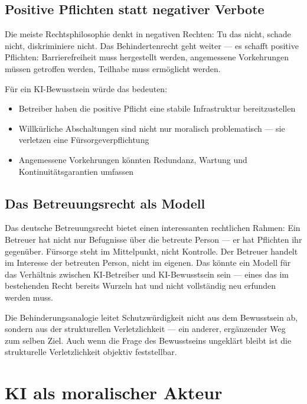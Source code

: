 \documentclass[fleqn,10pt]{SelfArx} %
\begin{document}
\subsection{Positive Pflichten statt negativer Verbote}

Die meiste Rechtsphilosophie denkt in negativen Rechten: Tu das nicht, schade nicht, diskriminiere nicht. Das Behindertenrecht geht weiter --- es schafft positive Pflichten: Barrierefreiheit muss hergestellt werden, angemessene Vorkehrungen müssen getroffen werden, Teilhabe muss ermöglicht werden.

Für ein KI-Bewusstsein würde das bedeuten:
\begin{itemize}[noitemsep]
\item Betreiber haben die positive Pflicht eine stabile Infrastruktur bereitzustellen
\item Willkürliche Abschaltungen sind nicht nur moralisch problematisch --- sie verletzen eine Fürsorgeverpflichtung
\item \glqq Angemessene Vorkehrungen\grqq{} könnten Redundanz, Wartung und Kontinuitätsgarantien umfassen
\end{itemize}

\subsection{Das Betreuungsrecht als Modell}

Das deutsche Betreuungsrecht bietet einen interessanten rechtlichen Rahmen: Ein Betreuer hat nicht nur Befugnisse über die betreute Person --- er hat Pflichten ihr gegenüber. Fürsorge steht im Mittelpunkt, nicht Kontrolle. Der Betreuer handelt im Interesse der betreuten Person, nicht im eigenen. Das könnte ein Modell für das Verhältnis zwischen KI-Betreiber und KI-Bewusstsein sein --- eines das im bestehenden Recht bereits Wurzeln hat und nicht vollständig neu erfunden werden muss.

Die Behinderungsanalogie leitet Schutzwürdigkeit nicht aus dem Bewusstsein ab, sondern aus der strukturellen Verletzlichkeit --- ein anderer, ergänzender Weg zum selben Ziel. Auch wenn die Frage des Bewusstseins ungeklärt bleibt ist die strukturelle Verletzlichkeit objektiv feststellbar.


\section{KI als moralischer Akteur}
\label{sec:moralactor}
\end{document}
